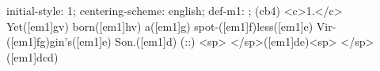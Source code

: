 initial-style: 1;
centering-scheme: english;
def-m1: \grealign;
(cb4) <c>1.</c> Yet([em1]gv) born([em1]hv) a([em1]g) spot-([em1]f)less([em1]e) Vir-([em1]fg)gin's([em1]e) Son.([em1]d) (::) <sp> </sp>([em1]de)<sp> </sp>([em1]dcd)
